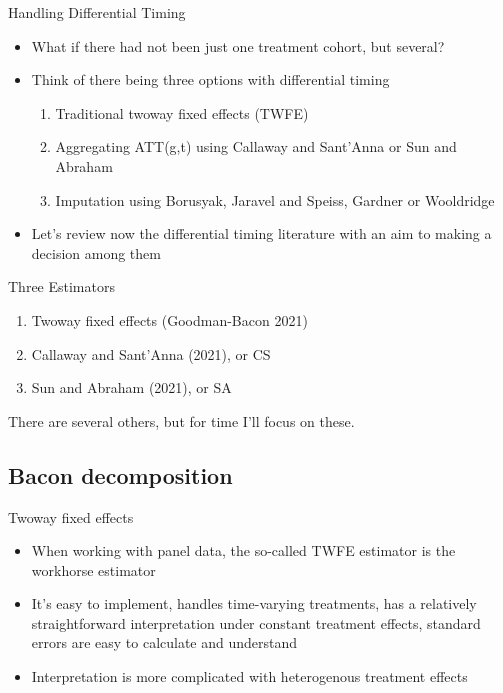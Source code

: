\documentclass{beamer}
\begin{document}
\begin{frame}{Handling Differential Timing}

\begin{itemize}
\item What if there had not been just one treatment cohort, but several? 
\item Think of there being three options with differential timing 
	\begin{enumerate}
	\item Traditional twoway fixed effects (TWFE)
	\item Aggregating ATT(g,t) using Callaway and Sant'Anna or Sun and Abraham
	\item Imputation using Borusyak, Jaravel and Speiss, Gardner or Wooldridge
	\end{enumerate}
\item  Let's review now the differential timing literature with an aim to making a decision among them
\end{itemize}

\end{frame}

\begin{frame}{Three Estimators}

\begin{enumerate}
\item Twoway fixed effects (Goodman-Bacon 2021)
\item Callaway and Sant'Anna (2021), or CS
\item Sun and Abraham (2021), or SA
\end{enumerate}

There are several others, but for time I'll focus on these. 
\end{frame}


\subsection{Bacon decomposition}

\begin{frame}{Twoway fixed effects}

\begin{itemize}
\item When working with panel data, the so-called TWFE estimator is the workhorse estimator
\item It's easy to implement, handles time-varying treatments, has a relatively straightforward interpretation under constant treatment effects, standard errors are easy to calculate and understand
\item Interpretation is more complicated with heterogenous treatment effects
\end{itemize}

\end{frame}
\end{document}
